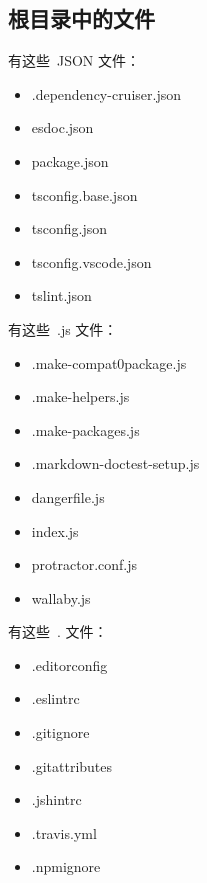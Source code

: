 \subsection{根目录中的文件}


有这些\, JSON 文件：

\begin{itemize}
  \item .dependency-cruiser.json
  \item esdoc.json
  \item package.json
  \item tsconfig.base.json
  \item tsconfig.json
  \item tsconfig.vscode.json
  \item tslint.json
\end{itemize}


有这些\, .js 文件：

\begin{itemize}
  \item .make-compat0package.js
  \item .make-helpers.js
  \item .make-packages.js
  \item .markdown-doctest-setup.js
  \item dangerfile.js
  \item index.js
  \item protractor.conf.js
  \item wallaby.js
\end{itemize}


有这些\, . 文件：

\begin{itemize}
  \item .editorconfig
  \item .eslintrc
  \item .gitignore
  \item .gitattributes
  \item .jshintrc
  \item .travis.yml
  \item .npmignore
\end{itemize}

